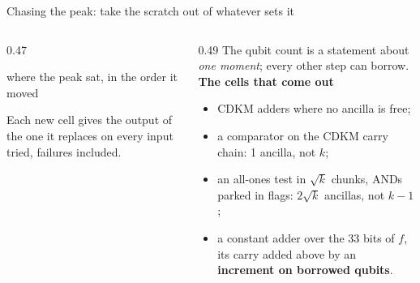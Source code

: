 \documentclass[aspectratio=169,11pt]{beamer}
\newcommand{\blocktitle}[1]{{\bfseries #1}\par\vskip1mm}
\begin{document}
\setcounter{framenumber}{184}
\begin{frame}{Chasing the peak: take the scratch out of whatever sets it}
  \begin{columns}[T]
    \begin{column}{0.47\textwidth}
      \centering
      \par
      {\scriptsize where the peak sat, in the order it moved}\par
      \vskip3mm
      \raggedright{\small Each new cell gives the output of the one it replaces on every input tried, failures included.}
    \end{column}
    \begin{column}{0.49\textwidth}
      \small The qubit count is a statement about \emph{one moment}; every other step can borrow.
      \vskip2mm
      \blocktitle{The cells that come out}
      \begin{itemize}\setlength{\itemsep}{0.6mm}
        \item CDKM adders where no ancilla is free;
        \item a comparator on the CDKM carry chain: 1 ancilla, not $k$;
        \item an all-ones test in $\sqrt k$ chunks, ANDs parked in flags: $2\sqrt k$ ancillas, not $k-1$;
        \item a constant adder over the 33 bits of $f$, its carry added above by an \textbf{increment on borrowed qubits}.
      \end{itemize}
    \end{column}
  \end{columns}
\end{frame}
\end{document}
